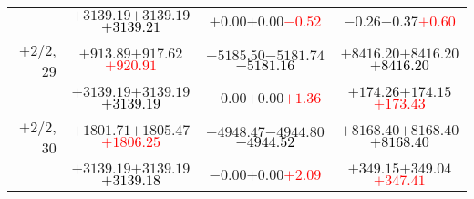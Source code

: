 \documentclass[compress]{beamer}
\begin{document}
\begin{frame}
{\begin{tabular}{r | c | c | c}
           & $+3139.19$\hspace{0.1 cm}$+3139.19$\hspace{0.1 cm}\textcolor{black}{$+3139.21$} & $+0.00$\hspace{0.1 cm}$+0.00$\hspace{0.1 cm}\textcolor{red}{$-0.52$} & $-0.26$\hspace{0.1 cm}$-0.37$\hspace{0.1 cm}\textcolor{red}{$+0.60$} \\
$+$2/2, 29 & $+913.89$\hspace{0.1 cm}$+917.62$\hspace{0.1 cm}\textcolor{red}{$+920.91$} & $-5185.50$\hspace{0.1 cm}$-5181.74$\hspace{0.1 cm}\textcolor{black}{$-5181.16$} & $+8416.20$\hspace{0.1 cm}$+8416.20$\hspace{0.1 cm}\textcolor{black}{$+8416.20$} \\
           & $+3139.19$\hspace{0.1 cm}$+3139.19$\hspace{0.1 cm}\textcolor{black}{$+3139.19$} & $-0.00$\hspace{0.1 cm}$+0.00$\hspace{0.1 cm}\textcolor{red}{$+1.36$} & $+174.26$\hspace{0.1 cm}$+174.15$\hspace{0.1 cm}\textcolor{red}{$+173.43$} \\
$+$2/2, 30 & $+1801.71$\hspace{0.1 cm}$+1805.47$\hspace{0.1 cm}\textcolor{red}{$+1806.25$} & $-4948.47$\hspace{0.1 cm}$-4944.80$\hspace{0.1 cm}\textcolor{black}{$-4944.52$} & $+8168.40$\hspace{0.1 cm}$+8168.40$\hspace{0.1 cm}\textcolor{black}{$+8168.40$} \\
           & $+3139.19$\hspace{0.1 cm}$+3139.19$\hspace{0.1 cm}\textcolor{black}{$+3139.18$} & $-0.00$\hspace{0.1 cm}$+0.00$\hspace{0.1 cm}\textcolor{red}{$+2.09$} & $+349.15$\hspace{0.1 cm}$+349.04$\hspace{0.1 cm}\textcolor{red}{$+347.41$} \\
\end{tabular}}
\end{frame}
\end{document}
